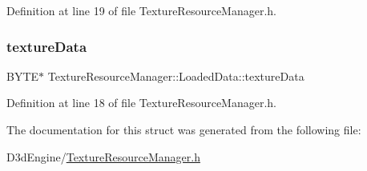 Definition at line 19 of file Texture\+Resource\+Manager.\+h.

\mbox{\label{struct_texture_resource_manager_1_1_loaded_data_ab8f8bbcc8db59da66d27455d98fec3d0}} 
\subsubsection{\texorpdfstring{texture\+Data}{textureData}}
{\footnotesize\ttfamily B\+Y\+TE$\ast$ Texture\+Resource\+Manager\+::\+Loaded\+Data\+::texture\+Data}



Definition at line 18 of file Texture\+Resource\+Manager.\+h.



The documentation for this struct was generated from the following file\+:\begin{DoxyCompactItemize}
\item 
D3d\+Engine/\mbox{\hyperlink{_texture_resource_manager_8h}{Texture\+Resource\+Manager.\+h}}\end{DoxyCompactItemize}
